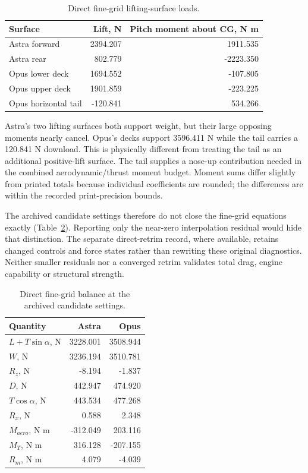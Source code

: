\documentclass[11pt,a4paper]{article}
\begin{document}
\begin{table}[H]\centering\small
\caption{Direct fine-grid lifting-surface loads.}\label{tab:loads}
\begin{tabular}{lrr}\toprule
Surface & Lift, N & Pitch moment about CG, N m\\\midrule
Astra forward &2394.207&1911.535\\
Astra rear &802.779&-2223.350\\
Opus lower deck &1694.552&-107.805\\
Opus upper deck &1901.859&-223.225\\
Opus horizontal tail &-120.841&534.266\\\bottomrule
\end{tabular}
\end{table}



Astra's two lifting surfaces both support weight, but their large opposing moments nearly cancel. Opus's decks support 3596.411 N while the tail carries a 120.841 N download. This is physically different from treating the tail as an additional positive-lift surface. The tail supplies a nose-up contribution needed in the combined aerodynamic/thrust moment budget. Moment sums differ slightly from printed totals because individual coefficients are rounded; the differences are within the recorded print-precision bounds.



The archived candidate settings therefore do not close the fine-grid equations exactly (Table~\ref{tab:residual}). Reporting only the near-zero interpolation residual would hide that distinction. The separate direct-retrim record, where available, retains changed controls and force states rather than rewriting these original diagnostics. Neither smaller residuals nor a converged retrim validates total drag, engine capability or structural strength.

\begin{table}[H]\centering\small
\caption{Direct fine-grid balance at the archived candidate settings.}\label{tab:residual}
\begin{tabular}{lrr}\toprule
Quantity & Astra & Opus\\\midrule
$L+T\sin\alpha$, N &3228.001&3508.944\\
$W$, N &3236.194&3510.781\\
$R_z$, N &-8.194&-1.837\\
$D$, N &442.947&474.920\\
$T\cos\alpha$, N &443.534&477.268\\
$R_x$, N &0.588&2.348\\
$M_{aero}$, N m &-312.049&203.116\\
$M_T$, N m &316.128&-207.155\\
$R_m$, N m &4.079&-4.039\\\bottomrule
\end{tabular}
\end{table}
\end{document}
